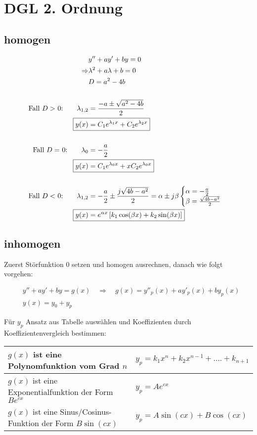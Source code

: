 \section{DGL 2. Ordnung}
\subsection{homogen}

\begin{align*}
&y'' + ay' +by = 0\\
\Rightarrow &\lambda^2 +a\lambda+b=0 \\
&D =  a^2-4b\\
\\
\text{Fall $D>$ 0:\qquad}\lambda_{1,2} &= \frac{-a\pm\sqrt{a^2-4b}}{2}\\
\Aboxed{y(x) &= C_{1}e^{\lambda_{1}x}+C_{2}e^{\lambda_{2}x}}\\
\\
\text{Fall $D=$ 0:\qquad}\lambda_{0} &= -\frac{a}{2}\\
\Aboxed{y(x) &= C_{1}e^{\lambda_{0}x}+xC_{2}e^{\lambda_{0}x}}\\
\\
\text{Fall $D<$ 0:\qquad}\lambda_{1,2} &= -\frac{a}{2}\pm \frac{j\sqrt{4b-a^2}}{2}
=\alpha\pm j\beta
\begin{cases}
\alpha = -\frac{a}{2}\\
\beta = \frac{\sqrt{4b-a^2}}{2}
\end{cases}\\
\Aboxed{y(x) &= e^{\alpha x}\left[k_{1}\cos(\beta x)+k_{2}\sin(\beta x)\right]}
\end{align*}

\subsection{inhomogen}

Zuerst Störfunktion 0 setzen und homogen ausrechnen, danach wie folgt vorgehen:

\begin{align*}
&y'' + ay' +by = g(x)\quad
\Rightarrow \quad g(x) = y''_{p}(x) + ay'_{p}(x)+by_{p}(x)\\
&y(x) = y_{0} + y_{p}
\end{align*}

Für $y_{p}$ Ansatz aus Tabelle auswählen und Koeffizienten durch Koeffizientenvergleich bestimmen:

\begin{table}[h]
\centering
\begin{tabular}{|l|l|}\hline
$g(x)$ ist eine Polynomfunktion vom Grad $n$ & $y_{p} = k_{1}x^{n}+k_{2}x^{n-1}+....+k_{n+1}$\\ \hline
$g(x)$ ist eine Exponentialfunktion der Form $Be^{cx}$ & $y_{p} = Ae^{cx}$ \\ \hline
 $g(x)$ ist eine Sinus/Cosinus-Funktion der Form $B\sin(cx)$ & $y_{p} = A\sin(cx)+B\cos(cx)$ \\ \hline
\end{tabular}
\end{table}


